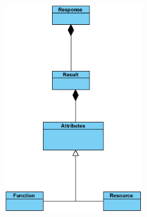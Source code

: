 \documentclass[12pt]{article}
\begin{document}
  \begin{center}
  \advance\leftskip-2.0cm
  \includegraphics[width=60mm]{Diagram2.png}  
  \end{center}
\end{document}
